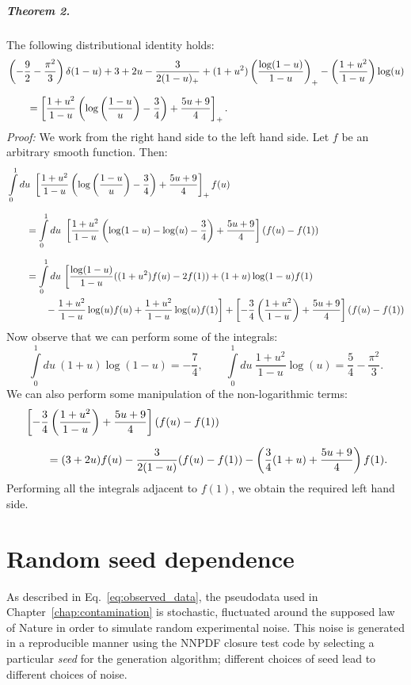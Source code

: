 \documentclass[withindex,glossary]{cam-thesis}
\begin{document}
\paragraph{Theorem 2.} The following distributional identity holds:
\begin{align}
& \left( -\frac{9}{2} - \frac{\pi^2}{3} \right) \delta(1-u) + 3 + 2u - \frac{3}{2(1-u)_+} + (1 + u^2) \left( \frac{\log(1-u)}{1-u} \right)_+ - \left( \frac{1+u^2}{1-u} \right) \log(u)\notag \\[1.5ex]
&\qquad = \left[ \frac{1+u^2}{1-u} \left( \log\left( \frac{1-u}{u} \right) - \frac{3}{4} \right) + \frac{5u + 9}{4} \right]_+.
\end{align}
\noindent \textit{Proof:} We work from the right hand side to the left hand side. Let $f$ be an arbitrary smooth function. Then:
\begin{align}
&\int\limits_{0}^{1} du\ \left[ \frac{1+u^2}{1-u} \left( \log\left( \frac{1-u}{u} \right) - \frac{3}{4} \right) + \frac{5u+9}{4} \right]_+ f(u)\notag \\[1.5ex]
& \qquad = \int\limits_{0}^{1} du\ \left[ \frac{1+u^2}{1-u} \left( \log(1-u) - \log(u) - \frac{3}{4} \right) + \frac{5u+9}{4} \right] \left( f(u) - f(1) \right)\\[1.5ex]
& \qquad = \int\limits_{0}^{1} du\ \bigg[ \frac{\log(1-u)}{1-u}((1+u^2) f(u) - 2 f(1)) + (1+u) \log(1-u) f(1)\notag \\
& \qquad \qquad - \frac{1+u^2}{1-u} \log(u) f(u) + \frac{1+u^2}{1-u} \log(u) f(1) \bigg] + \left[ -\frac{3}{4} \left(\frac{1+u^2}{1-u}\right) + \frac{5u+9}{4} \right] \left( f(u) - f(1) \right)
\end{align}
Now observe that we can perform some of the integrals:
\begin{equation}
\int\limits_{0}^{1} du\ (1+u) \log(1-u) = -\frac{7}{4}, \qquad \int\limits_{0}^{1} du\ \frac{1+u^2}{1-u} \log(u) = \frac{5}{4} - \frac{\pi^2}{3}.
\end{equation}
We can also perform some manipulation of the non-logarithmic terms:
\begin{align}
&\left[ -\frac{3}{4} \left(\frac{1+u^2}{1-u}\right) + \frac{5u+9}{4} \right] \left( f(u) - f(1) \right) \notag\\[1.5ex]
&\qquad = (3+2u) f(u) - \frac{3}{2(1-u)} (f(u) - f(1)) - \left( \frac{3}{4}(1+u) + \frac{5u+9}{4} \right) f(1).
\end{align}
Performing all the integrals adjacent to $f(1)$, we obtain the required left hand side. \qedsymbol

\chapter{Random seed dependence}
\label{app:random}
As described in Eq.~\eqref{eq:observed_data}, the pseudodata used in Chapter~\ref{chap:contamination} is stochastic, fluctuated around the supposed law of Nature in order to simulate random experimental noise. This noise is generated in a reproducible manner using the NNPDF closure test code by selecting a particular \textit{seed} for the generation algorithm; different choices of seed lead to different choices of noise.
\end{document}
